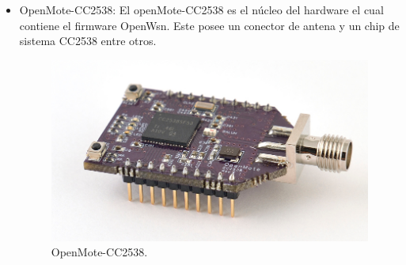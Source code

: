 \documentclass[journal]{IEEEtran}
\begin{document}
\begin{itemize}
        \item OpenMote-CC2538: El openMote-CC2538 es el núcleo del hardware el cual contiene el firmware OpenWsn. Este posee un conector de antena y un chip de sistema CC2538 entre otros.
        \begin{figure}[!ht]
			\begin{center}
			\includegraphics[scale=0.5]{motecc2538.jpg}
			\end{center}			            
			\caption{OpenMote-CC2538.}        
        \end{figure}
        

\end{itemize}
\end{document}
